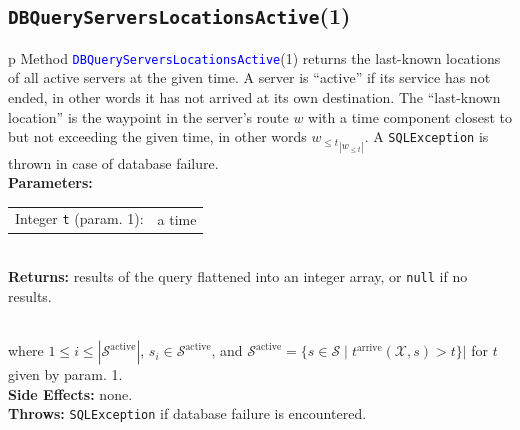 \subsection{\texttt{DBQueryServersLocationsActive}(1)}
\begin{tabular}{p{\textwidth}}
\toprule
{}
Method \textcolor{blue}{{\tt{}\protect{}DBQueryServersLocationsActive}}(1) returns the
last-known locations of all active servers at the given time. A server is
``active'' if its service has not ended, in other words it has not arrived
at its own destination.
The ``last-known location'' is the waypoint in the server's route $w$
with a time component closest to but not exceeding the given time, in other
words ${w_{\leq t}}_{|w_{\leq t}|}$.
A {\tt{}SQLException} is thrown in case of database failure.\\
\midrule
\textbf{Parameters:} \\
\begin{tabular}{lp{116mm}}
Integer {\tt{}t} (param. 1):&a time
\end{tabular}\\
\textbf{Returns:} results of the query flattened into an integer array, or
{\tt{}null} if no results.

\\

where $1\leq i\leq |\mathcal{S}^\textrm{active}|$,
$s_i\in \mathcal{S}^\textrm{active}$, and
$\mathcal{S}^\textrm{active}= \{s\in\mathcal{S}\mid t^\textrm{arrive}(\mathcal{X},s)>t\}|$
for $t$ given by param. 1.\\
\textbf{Side Effects:} none.\\
\textbf{Throws:} {\tt{}SQLException} if database failure is encountered.\\
\bottomrule
\end{tabular}
\nwenddocs{}\endmoddef{}
